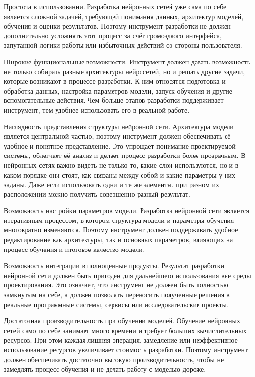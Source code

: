 \documentclass{report}
\begin{document}
\begin{enumarabic}
\item Простота в использовании. Разработка нейронных сетей уже сама по себе является сложной задачей, требующей понимания данных, архитектур моделей, обучения и оценки результатов. Поэтому инструмент разработки не должен дополнительно усложнять этот процесс за счёт громоздкого интерфейса, запутанной логики работы или избыточных действий со стороны пользователя.
\item Широкие функциональные возможности. Инструмент должен давать возможность не только собирать разные архитектуры нейросетей, но и решать другие задачи, которые возникают в процессе разработки. К ним относятся подготовка и обработка данных, настройка параметров модели, запуск обучения и другие вспомогательные действия. Чем больше этапов разработки поддерживает инструмент, тем удобнее использовать его в реальной работе.
\item Наглядность представления структуры нейронной сети. Архитектура модели является центральной частью, поэтому инструмент должен обеспечивать её удобное и понятное представление. Это упрощает понимание проектируемой системы, облегчает её анализ и делает процесс разработки более прозрачным. В нейронных сетях важно видеть не только то, какие слои используются, но и в каком порядке они стоят, как связаны между собой и какие параметры у них заданы. Даже если использовать одни и те же элементы, при разном их расположении можно получить совершенно разный результат.
\item Возможность настройки параметров модели. Разработка нейронной сети является итеративным процессом, в котором структура модели и параметры обучения многократно изменяются. Поэтому инструмент должен поддерживать удобное редактирование как архитектуры, так и основных параметров, влияющих на процесс обучения и итоговое качество модели.
\item Возможность интеграции в полноценные продукты. Результат разработки нейронной сети должен быть пригоден для дальнейшего использования вне среды проектирования. Это означает, что инструмент не должен быть полностью замкнутым на себе, а должен позволять переносить полученные решения в реальные программные системы, сервисы или исследовательские проекты.
\item Достаточная производительность при обучении моделей. Обучение нейронных сетей само по себе занимает много времени и требует больших вычислительных ресурсов. При этом каждая лишняя операция, замедление или неэффективное использование ресурсов увеличивает стоимость разработки. Поэтому инструмент должен обеспечивать достаточно высокую производительность, чтобы не замедлять процесс обучения и не делать работу с моделью дороже.
\end{enumarabic}
\end{document}
